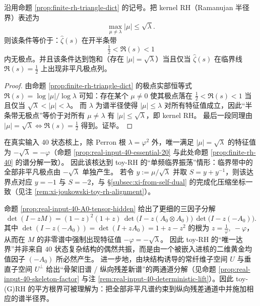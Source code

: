 \begin{corollary}\label{cor:finite-rh-halfstrip-nopoles}
沿用命题 \ref{prop:finite-rh-triangle-dict} 的记号。把 kernel RH（Ramanujan 半径界）表述为
\[
\max_{\mu\neq \lambda}|\mu|\le \sqrt{\lambda}.
\]
则该条件等价于：\(\widehat{\zeta}(s)\) 在开半条带
\[
\tfrac12<\Re(s)<1
\]
内无极点。并且该条件达到饱和（存在 \(|\mu|=\sqrt{\lambda}\)）当且仅当 \(\widehat{\zeta}(s)\) 在临界线 \(\Re(s)=\tfrac12\) 上出现非平凡极点列。
\end{corollary}
\begin{proof}
由命题 \ref{prop:finite-rh-triangle-dict} 的极点实部恒等式 \(\Re(s)=\log|\mu|/\log\lambda\) 可知：存在某个 \(\mu\neq 0\) 使其极点落在 \(\tfrac12<\Re(s)<1\) 当且仅当 \(\sqrt{\lambda}<|\mu|<\lambda\)。
而 \(\lambda\) 为谱半径使得 \(|\mu|\le \lambda\) 对所有特征值成立，因此“半条带无极点”等价于对所有 \(\mu\neq\lambda\) 有 \(|\mu|\le \sqrt{\lambda}\)，即 kernel RH。
最后一段同理由 \(|\mu|=\sqrt{\lambda}\iff \Re(s)=\tfrac12\) 得到。证毕。
\end{proof}

\begin{remark}[本核的达界位置：唯一临界模长 \texorpdfstring{$|\mu|=\sqrt{\lambda}$}{|mu|=sqrt(lambda)}]\label{rem:finite-rh-40-ramanujan}
在真实输入 40 状态核上，除 Perron 根 $\lambda=\varphi^2$ 外，唯一满足 $|\mu|=\sqrt{\lambda}$ 的特征值为 $-\sqrt{\lambda}=-\varphi$（命题 \ref{prop:real-input-40-essential-20} 与此处命题 \ref{prop:finite-rh-40} 的谱分解一致）。
因此该核达到 toy-RH 的“单频临界振荡”情形：临界带中的全部非平凡极点由 $-\sqrt{\lambda}$ 单独产生。
若令 \(y:=\mu/\sqrt{\lambda}\) 并取 \(S=y+y^{-1}\)，则该达界点对应 \(y=-1\) 与 \(S=-2\)，与 \S\ref{subsec:xi-from-self-dual} 的完成化压缩坐标一致（见注 \ref{rem:xi-joukowski-toy-rh-alignment}）。
\end{remark}

\begin{remark}\label{rem:finite-rh-40-hidden-minusA0}
命题 \ref{prop:real-input-40-A0-tensor-hidden} 给出了更细的三因子分解
\[
\det(I-zM)
=(1-z)^2(1+z)\,
\det\!\bigl(I-z(A_0\otimes A_0)\bigr)\,
\det\!\bigl(I-z(-A_0)\bigr).
\]
其中 \(\det(I-z(-A_0))=\det(I+zA_0)=1+z-z^2\) 的根为
\(
z=\frac{1}{\varphi},\ -\varphi
\)，
从而在 \(M\) 的非零谱中强制出现特征值 \(-\varphi=-\sqrt{\lambda}\)。
因此 toy-RH 的“唯一达界”并非来自 \(40\) 状态复杂结构的偶然共振，而是由一个被嵌入进核的二维黄金均值因子 \((-A_0)\) 所必然产生。
进一步地，由块结构诱导的常纤维子空间 \(U\) 与垂直子空间 \(U^\perp\) 给出“骨架旧谱 / 纵向残差新谱”的两通道分解（见命题 \ref{prop:real-input-40-skeleton-factor} 与注 \ref{rem:real-input-40-deterministic-lift}）。因此 toy-(G)RH 的平方根界可被理解为：把全部非平凡谱约束到纵向残差通道中并施加相应的谱半径界。
\end{remark}

